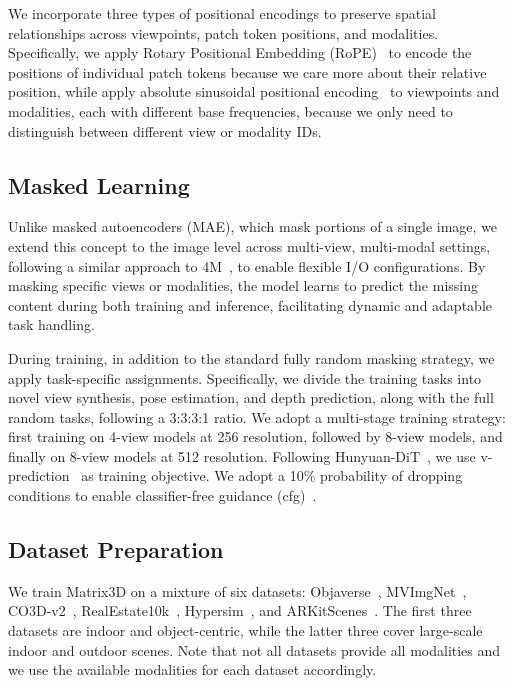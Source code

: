  We incorporate three types of positional encodings to preserve spatial relationships across viewpoints, patch token positions, and modalities. Specifically, we apply Rotary Positional Embedding (RoPE)~\cite{su2024roformer} to encode the positions of individual patch tokens because we care more about their relative position, while apply absolute sinusoidal positional encoding~\cite{dosovitskiy2020image} to viewpoints and modalities, each with different base frequencies, because we only need to distinguish between different view or modality IDs.

\subsection{Masked Learning}
\label{sec:3.2}

Unlike masked autoencoders (MAE), which mask portions of a single image, we extend this concept to the image level across multi-view, multi-modal settings, following a similar approach to 4M~\cite{mizrahi20244m}, to enable flexible I/O configurations. By masking specific views or modalities, the model learns to predict the missing content during both training and inference, facilitating dynamic and adaptable task handling.


 During training, in addition to the standard fully random masking strategy, we apply task-specific assignments. Specifically, we divide the training tasks into novel view synthesis, pose estimation, and depth prediction, along with the full random tasks, following a 3:3:3:1 ratio. We adopt a multi-stage training strategy: first training on 4-view models at 256 resolution, followed by 8-view models, and finally on 8-view models at 512 resolution.  Following Hunyuan-DiT~\cite{li2024hunyuan}, we use v-prediction~\cite{salimans2022progressive} as training objective. We adopt a 10\% probability of dropping conditions to enable classifier-free guidance (cfg)~\cite{ho2022classifier}. 

\subsection{Dataset Preparation}
\label{sec:3.3}
 We train Matrix3D on a mixture of six datasets: Objaverse~\cite{deitke2023objaverse}, MVImgNet~\cite{yu2023mvimgnet}, CO3D-v2~\cite{reizenstein21co3d}, RealEstate10k~\cite{zhou2018stereo}, Hypersim~\cite{roberts2021hypersim}, and ARKitScenes~\cite{baruch2021arkitscenes}. The first three datasets are indoor and object-centric, while the latter three cover large-scale indoor and outdoor scenes. 
Note that not all datasets provide all modalities and we use the available modalities for each dataset accordingly.

